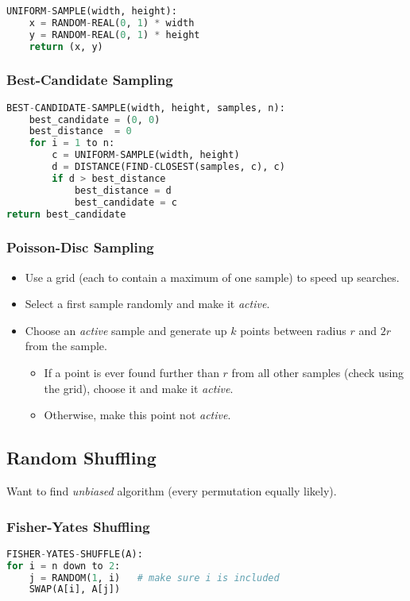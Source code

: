 \documentclass[twocolumn,english]{article}
\begin{document}
\begin{lstlisting}[language=Python,basicstyle={\footnotesize\ttfamily},tabsize=4,frame=single]
UNIFORM-SAMPLE(width, height):
	x = RANDOM-REAL(0, 1) * width
	y = RANDOM-REAL(0, 1) * height
	return (x, y)
\end{lstlisting}

\subsubsection*{Best-Candidate Sampling}

\begin{lstlisting}[language=Python,basicstyle={\footnotesize\ttfamily},tabsize=4,frame=single]
BEST-CANDIDATE-SAMPLE(width, height, samples, n):
	best_candidate = (0, 0)
	best_distance  = 0
	for i = 1 to n:
		c = UNIFORM-SAMPLE(width, height)
		d = DISTANCE(FIND-CLOSEST(samples, c), c)
		if d > best_distance
			best_distance = d
			best_candidate = c
return best_candidate
\end{lstlisting}

\subsubsection*{Poisson-Disc Sampling}
\begin{itemize}
\item Use a grid (each to contain a maximum of one sample) to speed up searches.
\item Select a first sample randomly and make it \emph{active}.
\item Choose an \emph{active} sample and generate up $k$ points between
radius $r$ and $2r$ from the sample.
\begin{itemize}
\item If a point is ever found further than $r$ from all other samples
(check using the grid), choose it and make it \emph{active}.
\item Otherwise, make this point not \emph{active}.
\end{itemize}
\end{itemize}

\subsection{Random Shuffling}

Want to find \emph{unbiased} algorithm (every permutation equally
likely).

\subsubsection*{Fisher-Yates Shuffling}

\begin{lstlisting}[language=Python,basicstyle={\footnotesize\ttfamily},tabsize=4,frame=single]
FISHER-YATES-SHUFFLE(A):
for i = n down to 2:
	j = RANDOM(1, i)   # make sure i is included
	SWAP(A[i], A[j])
\end{lstlisting}
\end{document}
